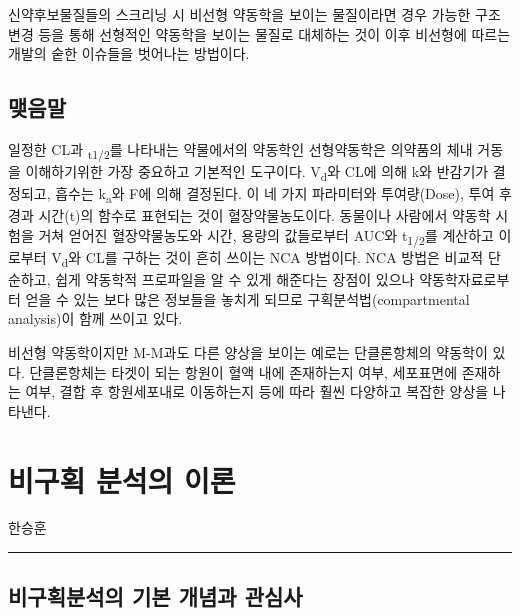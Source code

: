 \documentclass[
  11pt,
  krantz2, a4paper, twoside]{krantz}
\begin{document}
신약후보물질들의 스크리닝 시 비선형 약동학을 보이는 물질이라면 경우
가능한 구조변경 등을 통해 선형적인 약동학을 보이는 물질로 대체하는 것이
이후 비선형에 따르는 개발의 숱한 이슈들을 벗어나는 방법이다.

\hypertarget{uxb9fauxc74cuxb9d0}{%
\section{맺음말}\label{uxb9fauxc74cuxb9d0}}

일정한 CL과 \textsubscript{t1/2}를 나타내는 약물에서의 약동학인 선형약동학은 의약품의
체내 거동을 이해하기위한 가장 중요하고 기본적인 도구이다. V\textsubscript{d}와 CL에
의해 k와 반감기가 결정되고, 흡수는 k\textsubscript{a}와 F에 의해 결정된다. 이 네 가지
파라미터와 투여량(Dose), 투여 후 경과 시간(t)의 함수로 표현되는 것이
혈장약물농도이다. 동물이나 사람에서 약동학 시험을 거쳐 얻어진
혈장약물농도와 시간, 용량의 값들로부터 AUC와 t\textsubscript{1/2}를 계산하고 이로부터
V\textsubscript{d}와 CL를 구하는 것이 흔히 쓰이는 NCA 방법이다. NCA 방법은 비교적
단순하고, 쉽게 약동학적 프로파일을 알 수 있게 해준다는 장점이 있으나
약동학자료로부터 얻을 수 있는 보다 많은 정보들을 놓치게 되므로
구획분석법(compartmental analysis)이 함께 쓰이고 있다.

비선형 약동학이지만 M-M과도 다른 양상을 보이는 예로는 단클론항체의
약동학이 있다. 단클론항체는 타겟이 되는 항원이 혈액 내에 존재하는지
여부, 세포표면에 존재하는 여부, 결합 후 항원세포내로 이동하는지 등에
따라 훨씬 다양하고 복잡한 양상을 나타낸다.

\hypertarget{nca-principle}{%
\chapter{비구획 분석의 이론}\label{nca-principle}}

\Large\hfill

한승훈
\normalsize

\begin{center}\rule{0.5\linewidth}{0.5pt}\end{center}

\hypertarget{uxbe44uxad6cuxd68duxbd84uxc11duxc758-uxae30uxbcf8-uxac1cuxb150uxacfc-uxad00uxc2ecuxc0ac}{%
\section{비구획분석의 기본 개념과 관심사}\label{uxbe44uxad6cuxd68duxbd84uxc11duxc758-uxae30uxbcf8-uxac1cuxb150uxacfc-uxad00uxc2ecuxc0ac}}
\end{document}
